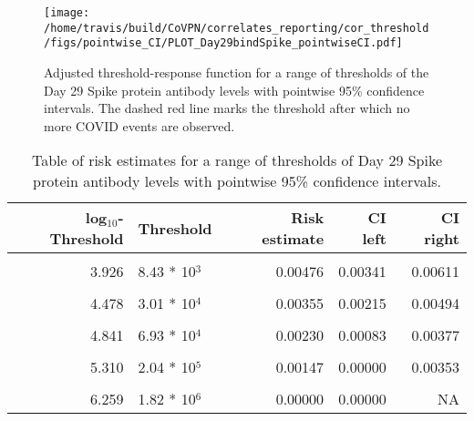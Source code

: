 \documentclass[]{book}
\theoremstyle{definition}
\theoremstyle{definition}
\theoremstyle{definition}
\newcommand{\1}{\mathbbm{1}}
\begin{document}
\begin{figure}[H]
\centering
\texttt{[image: /home/travis/build/CoVPN/correlates\_reporting/cor\_threshold/figs/pointwise\_CI/PLOT\_Day29bindSpike\_pointwiseCI.pdf]}
\caption{Adjusted threshold-response function for a range of thresholds of the
  Day 29 Spike protein antibody levels with pointwise 95\% confidence intervals. The dashed red line marks the threshold after which no more COVID events are observed. }
\end{figure}
\begin{table}[!h]

\caption{\label{tab:unnamed-chunk-355}Table of risk estimates for a range of thresholds of Day 29 Spike protein antibody levels with pointwise 95\% confidence intervals.}
\centering
\begin{tabular}[t]{rlrrr}
\toprule
log$_{10}$-Threshold & Threshold & Risk estimate & CI left & CI right\\
\midrule
\cellcolor{gray!6}{3.202} & \cellcolor{gray!6}{1.59 * 10$^3$} & \cellcolor{gray!6}{0.00567} & \cellcolor{gray!6}{0.00427} & \cellcolor{gray!6}{0.00707}\\
3.926 & 8.43 * 10$^3$ & 0.00476 & 0.00341 & 0.00611\\
\cellcolor{gray!6}{4.187} & \cellcolor{gray!6}{1.54 * 10$^4$} & \cellcolor{gray!6}{0.00460} & \cellcolor{gray!6}{0.00318} & \cellcolor{gray!6}{0.00602}\\
4.478 & 3.01 * 10$^4$ & 0.00355 & 0.00215 & 0.00494\\
\cellcolor{gray!6}{4.658} & \cellcolor{gray!6}{4.55 * 10$^4$} & \cellcolor{gray!6}{0.00278} & \cellcolor{gray!6}{0.00138} & \cellcolor{gray!6}{0.00419}\\
4.841 & 6.93 * 10$^4$ & 0.00230 & 0.00083 & 0.00377\\
\cellcolor{gray!6}{5.022} & \cellcolor{gray!6}{1.05 * 10$^5$} & \cellcolor{gray!6}{0.00182} & \cellcolor{gray!6}{0.00031} & \cellcolor{gray!6}{0.00332}\\
5.310 & 2.04 * 10$^5$ & 0.00147 & 0.00000 & 0.00353\\
\cellcolor{gray!6}{5.523} & \cellcolor{gray!6}{3.33 * 10$^5$} & \cellcolor{gray!6}{0.00132} & \cellcolor{gray!6}{0.00000} & \cellcolor{gray!6}{0.00393}\\
6.259 & 1.82 * 10$^6$ & 0.00000 & 0.00000 & NA\\
\bottomrule
\end{tabular}
\end{table}

\newpage
\end{document}
